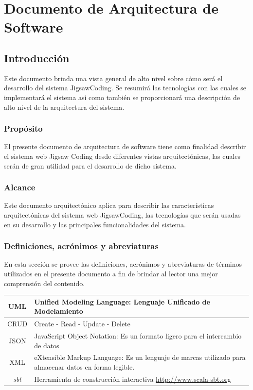 \chapter{Documento de Arquitectura de Software}\label{apendice.C}
\section{Introducción}
Este documento brinda una vista general de alto nivel sobre cómo será el desarrollo del sistema JigsawCoding. Se resumirá las tecnologías con las cuales se implementará el sistema así como también se proporcionará una descripción de alto nivel de la arquitectura del sistema.
\subsection{Propósito}
El presente documento de arquitectura de software tiene como finalidad describir el sistema web Jigsaw Coding desde diferentes vistas arquitectónicas, las cuales serán de gran utilidad para el desarrollo de dicho sistema.
\subsection{Alcance} Este documento arquitectónico aplica para describir las características arquitectónicas del sistema web JigsawCoding, las tecnologías que serán usadas en su desarrollo y las principales funcionalidades del sistema.
\subsection{Definiciones, acrónimos y abreviaturas}
En esta sección se provee las definiciones, acrónimos y abreviaturas de términos utilizados en el presente documento a fin de brindar al lector una mejor comprensión del contenido. 
\clearpage
\begin{longtable}{|c|L{8cm}|}
    \hline
  UML & Unified Modeling Language: Lenguaje Unificado de Modelamiento \\ \hline
  CRUD & Create - Read - Update - Delete \\ \hline
  JSON & JavaScript Object Notation: Es un formato ligero para el intercambio de datos \\ \hline
  XML & eXtensible Markup Language: Es un lenguaje de marcas utilizado para almacenar datos en forma legible. \\ \hline
  \emph{sbt} & Herramienta de construcción interactiva \url{http://www.scala-sbt.org} \\ \hline
\end{longtable}

